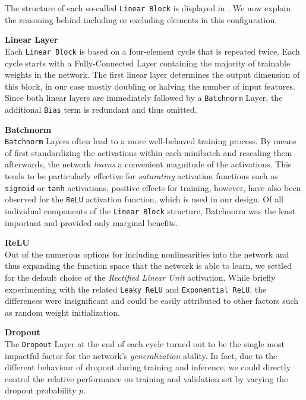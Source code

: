 The structure of each so-called \texttt{Linear Block} is displayed in .
We now explain the reasoning behind including or excluding elements in this configuration.

\textbf{Linear Layer} \\
Each \texttt{Linear Block} is based on a four-element cycle that is repeated twice.
Each cycle starts with a Fully-Connected Layer containing the majority of trainable weights in the network.
The first linear layer determines the output dimension of this block, in our case mostly doubling or halving the number of input features.
Since both linear layers are immediately followed by a \texttt{Batchnorm} Layer, the additional \texttt{Bias} term is redundant and thus omitted.

\textbf{Batchnorm} \\
\texttt{Batchnorm} Layers \citep{ioffe2015} often lead to a more well-behaved training process.
By means of first standardizing the activations within each minibatch and rescaling them afterwards, the network \emph{learns} a convenient magnitude of the activations.
This tends to be particularly effective for \emph{saturating} activation functions such as \texttt{sigmoid} or \texttt{tanh} activations, positive effects for training, however, have also been observed for the \texttt{ReLU} activation function, which is used in our design.
Of all individual components of the \texttt{Linear Block} structure, Batchnorm was the least important and provided only marginal benefits.

\textbf{ReLU} \\
Out of the numerous options for including nonlinearities into the network and thus expanding the function space that the network is able to learn, we settled for the default choice of the \emph{Rectified Linear Unit} activation.
While briefly experimenting with the related \texttt{Leaky ReLU} and \texttt{Exponential ReLU}, the differences were insignificant and could be easily attributed to other factors such as random weight initialization.

\textbf{Dropout} \label{dropout} \\ 
The \texttt{Dropout} Layer \citep{srivastava2014} at the end of each cycle turned out to be the single most impactful factor for the network's \emph{generalization} ability.
In fact, due to the different behaviour of dropout during training and inference, we could directly control the relative performance on training and validation set by varying the dropout probability $p$.

